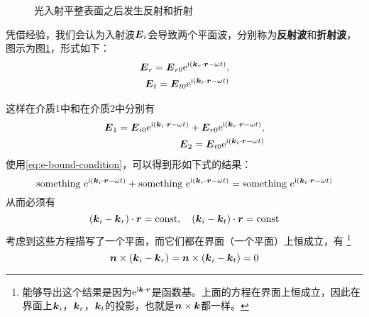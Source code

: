 \documentclass[UTF8, a4paper]{ctexart}
\newcommand*{\const}{\mathrm{const}}
\newcommand*{\ii}{\mathrm{i}}
\newcommand*{\ee}{\mathrm{e}}
\begin{document}
\begin{figure}
    \centering
    \caption{光入射平整表面之后发生反射和折射}
    \label{fig:ray-refraction}
\end{figure}

凭借经验，我们会认为入射波$\vb*{E}_i$会导致两个平面波，分别称为\textbf{反射波}和\textbf{折射波}，图示为图\ref{fig:ray-refraction}，形式如下：
\[
    \begin{split}
        \vb*{E}_r = \vb*{E}_{r0} \ee^{\ii(\vb*{k}_r \cdot \vb*{r} - \omega t)}, \\
        \vb*{E}_t = \vb*{E}_{t0} \ee^{\ii(\vb*{k}_t \cdot \vb*{r} - \omega t)}
    \end{split}
\]

这样在介质1中和在介质2中分别有
\[
    \begin{split}
        \vb*{E}_1 = \vb*{E}_{i0} \ee^{\ii(\vb*{k}_i \cdot \vb*{r} - \omega t)} +  \vb*{E}_{r0} \ee^{\ii(\vb*{k}_r \cdot \vb*{r} - \omega t)}, \\
        \vb*{E}_2 = \vb*{E}_{t0} \ee^{\ii(\vb*{k}_t \cdot \vb*{r} - \omega t)}
    \end{split}
\]
使用\eqref{eq:e-bound-condition}，可以得到形如下式的结果：
\[
    \text{something } \ee^{\ii(\vb*{k}_i \cdot \vb*{r} - \omega t)} + \text{something } \ee^{\ii(\vb*{k}_r \cdot \vb*{r} - \omega t)} = \text{something } \ee^{\ii(\vb*{k}_t \cdot \vb*{r} - \omega t)}
\]
从而必须有
\[
    (\vb*{k}_i - \vb*{k}_r) \cdot \vb*{r} = \const, \quad (\vb*{k}_i - \vb*{k}_t) \cdot \vb*{r} = \const
\]
考虑到这些方程描写了一个平面，而它们都在界面（一个平面）上恒成立，有%
\footnote{能够导出这个结果是因为$\ee^{\ii \vb*{k} \cdot \vb*{r}}$是函数基。上面的方程在界面上恒成立，因此在界面上$\vb*{k}_i$，$\vb*{k}_r$，$\vb*{k}_t$的投影，也就是$\vb*{n} \times \vb*{k}$都一样。}
\begin{equation}
    \vb*{n} \times (\vb*{k}_i - \vb*{k}_r) = \vb*{n} \times (\vb*{k}_i - \vb*{k}_t) = 0
    \label{eq:k-and-n}
\end{equation}
\end{document}
